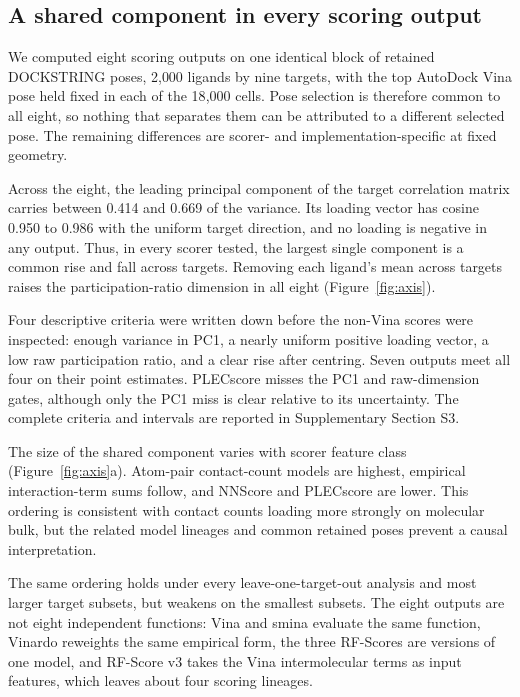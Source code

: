 \subsection{A shared component in every scoring output}
\label{sec:axis}

We computed eight scoring outputs on one identical block of retained DOCKSTRING poses,
2{,}000 ligands by nine targets, with the top AutoDock Vina pose held fixed in each of the
18{,}000 cells. Pose selection is therefore common to all eight, so nothing that separates them can
be attributed to a different selected pose. The remaining differences are scorer- and
implementation-specific at fixed geometry.

Across the eight, the leading principal component of the target correlation matrix carries
between 0.414 and 0.669 of the variance. Its loading vector has cosine 0.950 to 0.986
with the uniform target direction, and no loading is negative in any output. Thus, in every scorer
tested, the largest single component is a common rise and fall across targets. Removing each
ligand's mean across targets raises the participation-ratio dimension
in all eight (Figure~\ref{fig:axis}).

Four descriptive criteria were written down before the non-Vina scores were inspected: enough
variance in PC1, a nearly uniform positive loading vector, a low raw participation ratio, and a
clear rise after centring. Seven outputs meet all four on their point estimates. PLECscore misses
the PC1 and raw-dimension gates, although only the PC1 miss is clear relative to its uncertainty.
The complete criteria and intervals are reported in Supplementary Section S3.

The size of the shared component varies with scorer feature class (Figure~\ref{fig:axis}a).
Atom-pair contact-count models are highest, empirical interaction-term sums follow, and NNScore
and PLECscore are lower. This ordering is consistent with contact counts loading more strongly
on molecular bulk, but the related model lineages and common retained poses prevent a causal
interpretation.

The same ordering holds under every leave-one-target-out analysis and most larger target subsets,
but weakens on the smallest subsets. The eight outputs are not eight independent functions:
Vina and smina evaluate the same function, Vinardo reweights the same empirical form, the
three RF-Scores are versions of one model, and RF-Score v3 takes the Vina intermolecular
terms as input features, which leaves about four scoring lineages.

